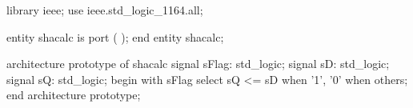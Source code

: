 library ieee;
use ieee.std_logic_1164.all;

entity shacalc is
    port (
    );
end entity shacalc;

architecture prototype of shacalc
    signal sFlag: std_logic;
    signal sD: std_logic;
    signal sQ: std_logic;
begin
    with sFlag select
	  sQ <= sD  when '1',
		'0' when others;
end architecture prototype;